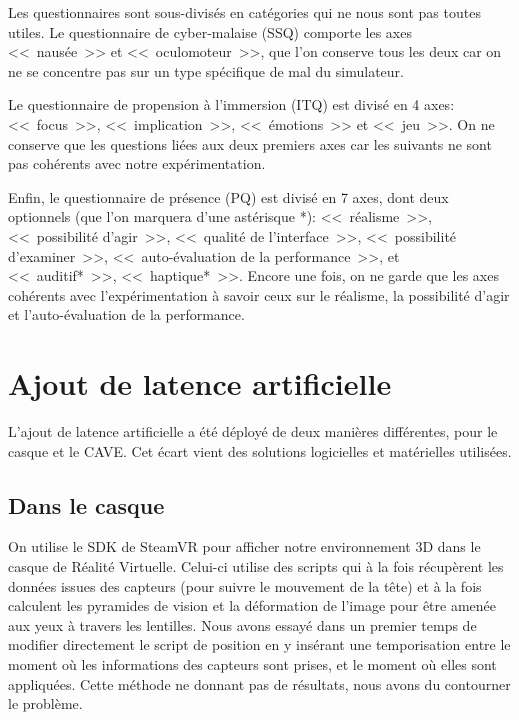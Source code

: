 	\par Les questionnaires sont sous-divisés en catégories qui ne nous sont pas toutes utiles. Le questionnaire de cyber-malaise (SSQ) comporte les axes <<~nausée~>> et <<~oculomoteur~>>, que l'on conserve tous les deux car on ne se concentre pas sur un type spécifique de mal du simulateur.
	
	\par Le questionnaire de propension à l'immersion (ITQ) est divisé en 4 axes: <<~focus~>>, <<~implication~>>, <<~émotions~>> et <<~jeu~>>. On ne conserve que les questions liées aux deux premiers axes car les suivants ne sont pas cohérents avec notre expérimentation.
	
	\par Enfin, le questionnaire de présence (PQ) est divisé en 7 axes, dont deux optionnels (que l'on marquera d'une astérisque *): <<~réalisme~>>, <<~possibilité d'agir~>>, <<~qualité de l'interface~>>, <<~possibilité d'examiner~>>, <<~auto-évaluation de la performance~>>, et <<~auditif*~>>, <<~haptique*~>>. Encore une fois, on ne garde que les axes cohérents avec l'expérimentation à savoir ceux sur le réalisme, la possibilité d'agir et l'auto-évaluation de la performance.
		
	\section{Ajout de latence artificielle}
	\label{sec:ajout_latence_artificielle}
	\par L'ajout de latence artificielle a été déployé de deux manières différentes, pour le casque et le CAVE. Cet écart vient des solutions logicielles et matérielles utilisées.
	
	\subsection{Dans le casque}
	\par On utilise le SDK de SteamVR pour afficher notre environnement 3D dans le casque de Réalité Virtuelle. Celui-ci utilise des scripts qui à la fois récupèrent les données issues des capteurs (pour suivre le mouvement de la tête) et à la fois calculent les pyramides de vision et la déformation de l'image pour être amenée aux yeux à travers les lentilles. Nous avons essayé dans un premier temps de modifier directement le script de position en y insérant une temporisation entre le moment où les informations des capteurs sont prises, et le moment où elles sont appliquées. Cette méthode ne donnant pas de résultats, nous avons du contourner le problème.
	
